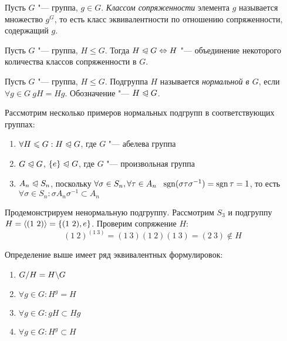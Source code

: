 \begin{definition}
	Пусть $G$ "--- группа, $g \in G$. \textit{Классом сопряженности} элемента $g$ называется множество $g^G$, то есть класс эквивалентности по отношению сопряженности, содержащий $g$.
\end{definition}

\begin{exercise}
	Пусть $G$ "--- группа, $H \le G$. Тогда $H \normal G \hm\Leftrightarrow H$ "--- объединение некоторого количества классов сопряженности в $G$.
\end{exercise}

\begin{definition}
	Пусть $G$ "--- группа, $H \le G$. Подгруппа $H$ называется \textit{нормальной в $G$}, если $\forall g \in G\ gH = Hg$. Обозначение "--- $H \trianglelefteqslant G$.
\end{definition}

\begin{example}
	Рассмотрим несколько примеров нормальных подгрупп в соответствующих группах:
	\begin{enumerate}
		\item $\forall H \leqslant G: H \trianglelefteqslant G$, где $G$ "--- абелева группа
		\item $G \trianglelefteqslant G$, $\{e\} \trianglelefteqslant G$, где $G$ "--- произвольная группа
		\item $A_n \trianglelefteqslant S_n$, поскольку $\forall \sigma \in S_n, \forall \tau \in A_n\ \ \sgn(\sigma\tau\sigma^{-1}) = \sgn\tau = 1$, то есть $\forall \sigma \in S_n: \sigma A_n\sigma^{-1} \subset A_n$
	\end{enumerate}
\end{example}

\begin{example}
	Продемонстрируем ненормальную подгруппу. Рассмотрим $S_3$ и подгруппу $H = \langle(1\ 2)\rangle = \{(1\ 2), e\}$. Проверим сопряжение $H$:
	\[
	(1\ 2)^{(1 \ 3)} = (1\ 3)(1\ 2)(1\ 3) = (2\ 3) \notin H
	\]
\end{example}

\begin{proposition}
	Определение выше имеет ряд эквивалентных формулировок:
	\begin{enumerate}
		\item $G / H = H \backslash G$
		
		\item $\forall g \in G: H^g = H$
		
		\item $\forall g \in G: gH \subset Hg$
		
		\item $\forall g \in G: H^g \subset H$
	\end{enumerate}
\end{proposition}

